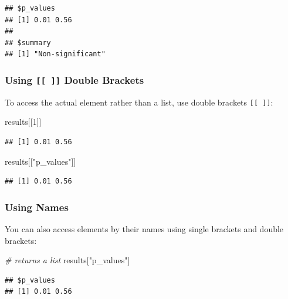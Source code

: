 \documentclass[
]{book}
\newenvironment{Shaded}{\begin{snugshade}}{\end{snugshade}}
\newcommand{\CommentTok}[1]{\textcolor[rgb]{0.56,0.35,0.01}{\textit{#1}}}
\newcommand{\DecValTok}[1]{\textcolor[rgb]{0.00,0.00,0.81}{#1}}
\newcommand{\NormalTok}[1]{#1}
\newcommand{\StringTok}[1]{\textcolor[rgb]{0.31,0.60,0.02}{#1}}
\begin{document}
\begin{verbatim}
## $p_values
## [1] 0.01 0.56
## 
## $summary
## [1] "Non-significant"
\end{verbatim}

\hypertarget{using-double-brackets}{%
\subsubsection{\texorpdfstring{Using \texttt{{[}{[}\ {]}{]}} Double Brackets}{Using {[}{[} {]}{]} Double Brackets}}\label{using-double-brackets}}

To access the actual element rather than a list, use double brackets \texttt{{[}{[}\ {]}{]}}:

\begin{Shaded}
\begin{Highlighting}[]
\NormalTok{results[[}\DecValTok{1}\NormalTok{]]}
\end{Highlighting}
\end{Shaded}

\begin{verbatim}
## [1] 0.01 0.56
\end{verbatim}

\begin{Shaded}
\begin{Highlighting}[]
\NormalTok{results[[}\StringTok{"p\_values"}\NormalTok{]]}
\end{Highlighting}
\end{Shaded}

\begin{verbatim}
## [1] 0.01 0.56
\end{verbatim}

\hypertarget{using-names}{%
\subsubsection{Using Names}\label{using-names}}

You can also access elements by their names using single brackets and double brackets:

\begin{Shaded}
\begin{Highlighting}[]
\CommentTok{\# returns a list}
\NormalTok{results[}\StringTok{"p\_values"}\NormalTok{]}
\end{Highlighting}
\end{Shaded}

\begin{verbatim}
## $p_values
## [1] 0.01 0.56
\end{verbatim}
\end{document}
